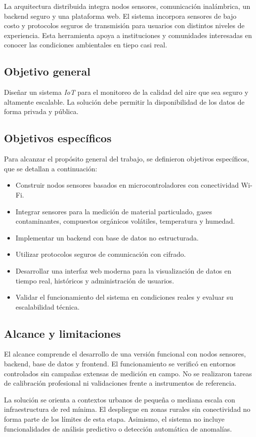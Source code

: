 La arquitectura distribuida integra nodos sensores, comunicación inalámbrica, un backend seguro y una plataforma web. El sistema incorpora sensores de bajo costo y protocolos seguros de transmisión para usuarios con distintos niveles de experiencia. Esta herramienta apoya a instituciones y comunidades interesadas en conocer las condiciones ambientales en tiepo casi real.

\subsection{Objetivo general}

Diseñar un sistema \textit{IoT} para el monitoreo de la calidad del aire que sea seguro y altamente escalable. La solución debe permitir la disponibilidad de los datos de forma privada y pública.

\subsection{Objetivos específicos}

Para alcanzar el propósito general del trabajo, se definieron objetivos específicos, que se detallan a continuación:

\begin{itemize}
    \item Construir nodos sensores basados en microcontroladores con conectividad Wi-Fi.
    \item Integrar sensores para la medición de material particulado, gases contaminantes, compuestos orgánicos volátiles, temperatura y humedad.
    \item Implementar un backend con base de datos no estructurada.
    \item Utilizar protocolos seguros de comunicación con cifrado.
    \item Desarrollar una interfaz web moderna para la visualización de datos en tiempo real, históricos y administración de usuarios.
    \item Validar el funcionamiento del sistema en condiciones reales y evaluar su escalabilidad técnica.
\end{itemize}

\subsection{Alcance y limitaciones}

El alcance comprende el desarrollo de una versión funcional con nodos sensores, backend, base de datos y frontend. El funcionamiento se verificó en entornos controlados sin campañas extensas de medición en campo. No se realizaron tareas de calibración profesional ni validaciones frente a instrumentos de referencia.

La solución se orienta a contextos urbanos de pequeña o mediana escala con infraestructura de red mínima. El despliegue en zonas rurales sin conectividad no forma parte de los límites de esta etapa. Asimismo, el sistema no incluye funcionalidades de análisis predictivo o detección automática de anomalías.

